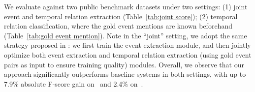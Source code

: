 \begin{table*}[t]
\small
\centering
{}
\caption{Comparison of various approaches on temporal relation classification with gold event mentions as input.}
\label{tab:gold event mention}
\end{table*}

We 
evaluate \this{} against two public benchmark datasets under two settings: (1) joint event and temporal relation extraction (Table~\ref{tab:joint score}); (2) temporal relation classification, where the gold event mentions are known beforehand (Table~\ref{tab:gold event mention}). Note in the ``joint'' setting, we adopt the same strategy proposed in \cite{han2019joint}: we first train the event extraction module, and then jointly optimize both event extraction and temporal relation extraction (using gold event pairs as input to ensure training quality) modules.
Overall, we observe that our approach significantly outperforms baseline systems in both settings, with up to 7.9\% absolute F-score gain on~\matres{} and 2.4\% on~\tbd{}. 

